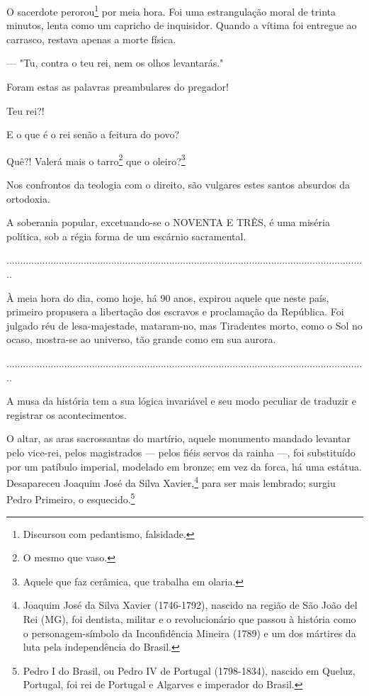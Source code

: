 {O sacerdote perorou\footnote{Discursou com pedantismo, falsidade.} por
meia hora. Foi uma estrangulação moral de trinta minutos, lenta como um
capricho de inquisidor. Quando a vítima foi entregue ao carrasco,
restava apenas a morte física.

--- "Tu, contra o teu rei, nem os olhos levantarás."

Foram estas as palavras preambulares do pregador!

Teu rei?!

E o que é o rei senão a feitura do povo?

Quê?! Valerá mais o tarro\footnote{O mesmo que vaso.} que o
oleiro?\footnote{Aquele que faz cerâmica, que trabalha em olaria.}

Nos confrontos da teologia com o direito, são vulgares estes santos
absurdos da ortodoxia.

A soberania popular, excetuando-se o NOVENTA E TRÊS, é uma miséria
política, sob a régia forma de um escárnio sacramental.

...................................................................................................................................

À meia hora do dia, como hoje, há 90 anos, expirou aquele que neste
país, primeiro propusera a libertação dos escravos e proclamação da
República. Foi julgado réu de lesa-majestade, mataram-no, mas Tiradentes
morto, como o Sol no ocaso, mostra-se ao universo, tão grande como em
sua aurora.

...................................................................................................................................

A musa da história tem a sua lógica invariável e seu modo peculiar de
traduzir e registrar os acontecimentos.

O altar, as aras sacrossantas do martírio, aquele monumento mandado
levantar pelo vice-rei, pelos magistrados --- pelos fiéis servos da
rainha ---, foi substituído por um patíbulo imperial, modelado em
bronze; em vez da forca, há uma estátua. Desapareceu Joaquim José da
Silva Xavier,\footnote{Joaquim José da Silva Xavier (1746-1792),
  nascido na região de São João del Rei (MG), foi dentista, militar e o
  revolucionário que passou à história como o personagem-símbolo da
  Inconfidência Mineira (1789) e um dos mártires da luta pela
  independência do Brasil.} para ser mais lembrado; surgiu Pedro
Primeiro, o esquecido.\footnote{Pedro I do Brasil, ou Pedro IV de
  Portugal (1798-1834), nascido em Queluz, Portugal, foi rei de Portugal
  e Algarves e imperador do Brasil.}

}
